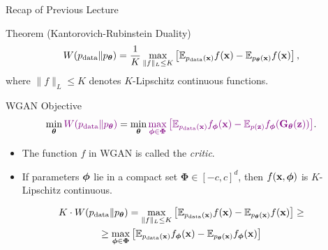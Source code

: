 \documentclass{beamer}
\begin{document}
\begin{frame}{Recap of Previous Lecture}
	\begin{block}{Theorem (Kantorovich-Rubinstein Duality)}
		\vspace{-0.2cm}
		\[
		W(p_{\text{data}} \| p_{\boldsymbol{\theta}}) = \frac{1}{K} \max_{\| f \|_L \leq K} \left[ \mathbb{E}_{p_{\text{data}}(\mathbf{x})} f(\mathbf{x})  - \mathbb{E}_{p_{\boldsymbol{\theta}}(\mathbf{x})} f(\mathbf{x})\right],
		\]
		where $\| f \|_L \leq K$ denotes $K$-Lipschitz continuous functions.
	\end{block}
	\begin{block}{WGAN Objective}
		\vspace{-0.5cm}
		\[
		\min_{\boldsymbol{\theta}} {\color{violet}W(p_{\text{data}} \| p_{\boldsymbol{\theta}})} = \min_{\boldsymbol{\theta}} {\color{violet}\max_{\boldsymbol{\phi} \in \boldsymbol{\Phi}} \left[ \mathbb{E}_{p_{\text{data}}(\mathbf{x})} f_{\boldsymbol{\phi}}(\mathbf{x})  - \mathbb{E}_{p(\mathbf{z})} f_{\boldsymbol{\phi}}(\mathbf{G}_{\boldsymbol{\theta}}(\mathbf{z}))\right]}.
		\]
		\vspace{-0.5cm}
	\end{block}
	\begin{itemize}
		\item The function $f$ in WGAN is called the \textit{critic}.
		\item If parameters $\boldsymbol{\phi}$ lie in a compact set $\boldsymbol{\Phi} \in [-c, c]^d$, then $f(\mathbf{x}, \boldsymbol{\phi})$ is $K$-Lipschitz continuous. 
	\end{itemize}
	\begin{multline*}
		K \cdot W(p_{\text{data}} \| p_{\boldsymbol{\theta}}) = \max_{\| f \|_L \leq K} \left[ \mathbb{E}_{p_{\text{data}}(\mathbf{x})} f(\mathbf{x}) - \mathbb{E}_{p_{\boldsymbol{\theta}}(\mathbf{x})} f(\mathbf{x})\right] \geq 
		\\ \geq \max_{\boldsymbol{\phi} \in \boldsymbol{\Phi}} \left[ \mathbb{E}_{p_{\text{data}}(\mathbf{x})} f_{\boldsymbol{\phi}}(\mathbf{x})  - \mathbb{E}_{p_{\boldsymbol{\theta}}(\mathbf{x})} f_{\boldsymbol{\phi}}(\mathbf{x})\right]
	\end{multline*}
\end{frame}
\end{document}
